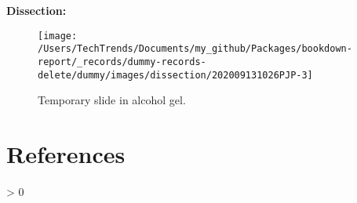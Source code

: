 \documentclass[
]{article}
\newlength{\cslhangindent}
\newenvironment{CSLReferences}[2] %
 {%
  \setlength{\parindent}{0pt}
  \ifodd #1 \everypar{\setlength{\hangindent}{\cslhangindent}}\ignorespaces\fi
  \ifnum #2 > 0
  \setlength{\parskip}{#2\baselineskip}
  \fi
 }%
 {}
\begin{document}
\textbf{Dissection:}

\begin{figure}[p]

{\centering \texttt{[image: /Users/TechTrends/Documents/my\_github/Packages/bookdown-report/\_records/dummy-records-delete/dummy/images/dissection/202009131026PJP-3]} 

}

\caption{Temporary slide in alcohol gel.}\label{fig:unnamed-chunk-34}
\end{figure}

\hypertarget{references}{%
\section*{References}\label{references}}

\hypertarget{refs}{}
\begin{CSLReferences}{0}{0}
\end{CSLReferences}

\let\cleardoublepage\clearpage
\end{document}
